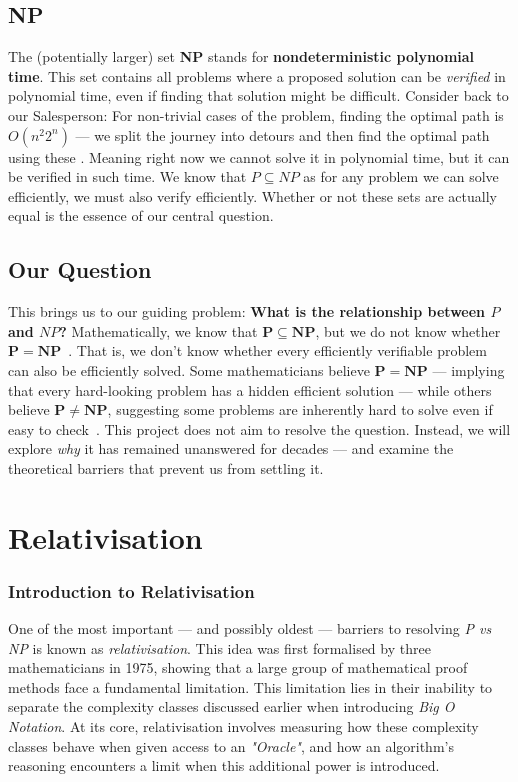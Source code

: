 \documentclass[12pt]{report}
\begin{document}
\section{NP}
The (potentially larger) set \textbf{NP} stands for \textbf{nondeterministic polynomial time}.
This set contains all problems where a proposed solution can be \textit{verified} in polynomial time, even if finding that solution might be difficult.
Consider back to our Salesperson: For non-trivial cases of the problem, finding the optimal path is \( O(n^2 2^n) \) --- we split the journey into detours and then find the optimal path using these \cite{held1962}.
Meaning right now we cannot solve it in polynomial time, but it can be verified in such time.
We know that $P \subseteq NP$ as for any problem we can solve efficiently, we must also verify efficiently.
Whether or not these sets are actually equal is the essence of our central question.

\section{Our Question}
This brings us to our guiding problem: \textbf{What is the relationship between $P$ and $NP$?}
Mathematically, we know that $\mathbf{P} \subseteq \mathbf{NP}$, but we do not know whether $\mathbf{P} = \mathbf{NP}$~\cite{arora2009}.
That is, we don't know whether every efficiently verifiable problem can also be efficiently solved.
Some mathematicians believe $\mathbf{P = NP}$ --- implying that every hard-looking problem has a hidden efficient solution --- while others believe $\mathbf{P \neq NP}$, suggesting some problems are inherently hard to solve even if easy to check~\cite{claymillennium}.
This project does not aim to resolve the question.
Instead, we will explore \textit{why} it has remained unanswered for decades --- and examine the theoretical barriers that prevent us from settling it.

\newpage
\chapter{Relativisation}
\subsection{Introduction to Relativisation}
One of the most important --- and possibly oldest --- barriers to resolving \textit{P vs NP} is known as \textit{relativisation}.
This idea was first formalised by three mathematicians in 1975, showing that a large group of mathematical proof methods face a fundamental limitation.
This limitation lies in their inability to separate the complexity classes discussed earlier when introducing \textit{Big O Notation}.
At its core, relativisation involves measuring how these complexity classes behave when given access to an \textit{"Oracle"}, and how an algorithm's reasoning encounters a limit when this additional power is introduced.
\end{document}

